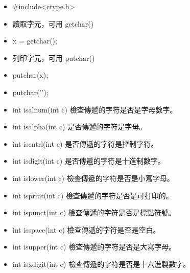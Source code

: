\begin{itemize}
    \item #include<ctype.h>
    
    \item 讀取字元，可用 getchar()
    \item x = getchar();
    \item 列印字元，可用 putchar()
    \item putchar(x);
    \item putchar('\n');
    
    \item int isalnum(int c) 檢查傳遞的字符是否是字母數字。
    \item int isalpha(int c) 是否傳遞的字符是字母。
    \item int iscntrl(int c) 是否傳遞的字符是控制字符。
    \item int isdigit(int c) 是否傳遞的字符是十進制數字。
    \item int islower(int c) 檢查傳遞的字符是否是小寫字母。
    \item int isprint(int c) 檢查傳遞的字符是否是可打印的。
    \item int ispunct(int c) 檢查傳遞的字符是否是標點符號。
    \item int isspace(int c) 檢查傳遞的字符是否是空白。
    \item int isupper(int c) 檢查傳遞的字符是否是大寫字母。
    \item int isxdigit(int c) 檢查傳遞的字符是否是十六進製數字。
    \end{itemize}